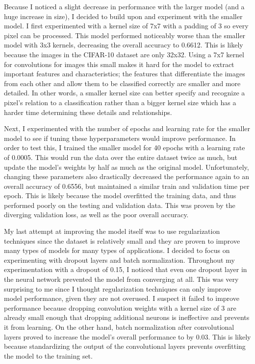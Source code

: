 \documentclass[11pt,a4paper]{article}
\begin{document}
Because I noticed a slight decrease in performance with the larger model (and a huge increase in size), I decided to build upon and experiment
 with the smaller model. I first experimented with a kernel size of 7x7 with a padding of 3 so every pixel can be processed.
  This model performed noticeably worse than the smaller model with 3x3 kernels, decreasing the overall accuracy to 0.6612.
   This is likely because the images in the CIFAR-10 dataset are only 32x32. Using a 7x7 kernel for convolutions for images this 
   small makes it hard for the model to extract important features and characteristics; the features that differentiate the images
    from each other and allow them to be classified correctly are smaller and more detailed. In other words, a smaller kernel size 
    can better specify and recognize a pixel's relation to a classification rather than a bigger kernel size which has a harder 
    time determining these details and relationships.

Next, I experimented with the number of epochs and learning rate for the smaller model to see if tuning these hyperparameters 
 would improve performance. In order to test this, I trained the smaller model for 40 epochs with a learning rate of 0.0005.
  This would run the data over the entire dataset twice as much, but update the model's weights by half as much as the original 
  model. Unfortunately, changing these parameters also drastically decreased the performance again to an overall accuracy of 0.6556, 
  but maintained a similar train and validation time per epoch. This is likely because the model overfitted the training data, 
  and thus performed poorly on the testing and validation data. This was proven by the diverging validation loss, as well as the 
  poor overall accuracy.

My last attempt at improving the model itself was to use regularization techniques since the dataset is relatively small and
 they are proven to improve many types of models for many types of applications. I decided to focus on experimenting with dropout 
 layers and batch normalization. Throughout my experimentation with a dropout of 0.15, I noticed that even one dropout layer in 
 the neural network prevented the model from converging \italics at all. This was very surprising to me since I thought regularization 
 techniques can only improve model performance, given they are not overused. I suspect it failed to improve performance because dropping 
 convolution weights with a kernel size of 3 are already small enough that dropping additional neurons is ineffective and prevents it
  from learning. On the other hand, batch normalization after convolutional layers proved to increase the model's overall performance
  to by 0.03. This is likely because standardizing the output of the convolutional layers prevents overfitting the model to the training set.
\end{document}
